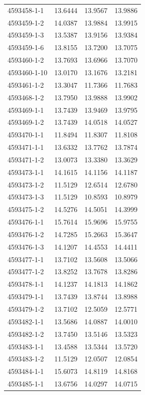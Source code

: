 \begin{longtable}{lrrr}
4593458-1-1 & 13.6444 & 13.9567 & 13.9886 \\
4593459-1-2 & 14.0387 & 13.9884 & 13.9915 \\
4593459-1-3 & 13.5387 & 13.9156 & 13.9384 \\
4593459-1-6 & 13.8155 & 13.7200 & 13.7075 \\
4593460-1-2 & 13.7693 & 13.6966 & 13.7070 \\
4593460-1-10 & 13.0170 & 13.1676 & 13.2181 \\
4593461-1-2 & 13.3047 & 11.7366 & 11.7683 \\
4593468-1-2 & 13.7950 & 13.9888 & 13.9902 \\
4593469-1-1 & 13.7439 & 13.9469 & 13.9795 \\
4593469-1-2 & 13.7439 & 14.0518 & 14.0527 \\
4593470-1-1 & 11.8494 & 11.8307 & 11.8108 \\
4593471-1-1 & 13.6332 & 13.7762 & 13.7874 \\
4593471-1-2 & 13.0073 & 13.3380 & 13.3629 \\
4593473-1-1 & 14.1615 & 14.1156 & 14.1187 \\
4593473-1-2 & 11.5129 & 12.6514 & 12.6780 \\
4593473-1-3 & 11.5129 & 10.8593 & 10.8979 \\
4593475-1-2 & 14.5276 & 14.5051 & 14.3999 \\
4593476-1-1 & 15.7614 & 15.9696 & 15.9755 \\
4593476-1-2 & 14.7285 & 15.2663 & 15.3647 \\
4593476-1-3 & 14.1207 & 14.4553 & 14.4411 \\
4593477-1-1 & 13.7102 & 13.5608 & 13.5066 \\
4593477-1-2 & 13.8252 & 13.7678 & 13.8286 \\
4593478-1-1 & 14.1237 & 14.1813 & 14.1862 \\
4593479-1-1 & 13.7439 & 13.8744 & 13.8988 \\
4593479-1-2 & 13.7102 & 12.5059 & 12.5771 \\
4593482-1-1 & 13.5686 & 14.0887 & 14.0010 \\
4593482-1-2 & 13.7450 & 13.5146 & 13.5323 \\
4593483-1-1 & 13.4588 & 13.5344 & 13.5720 \\
4593483-1-2 & 11.5129 & 12.0507 & 12.0854 \\
4593484-1-1 & 15.6073 & 14.8119 & 14.8168 \\
4593485-1-1 & 13.6756 & 14.0297 & 14.0715 \\

\end{longtable}
